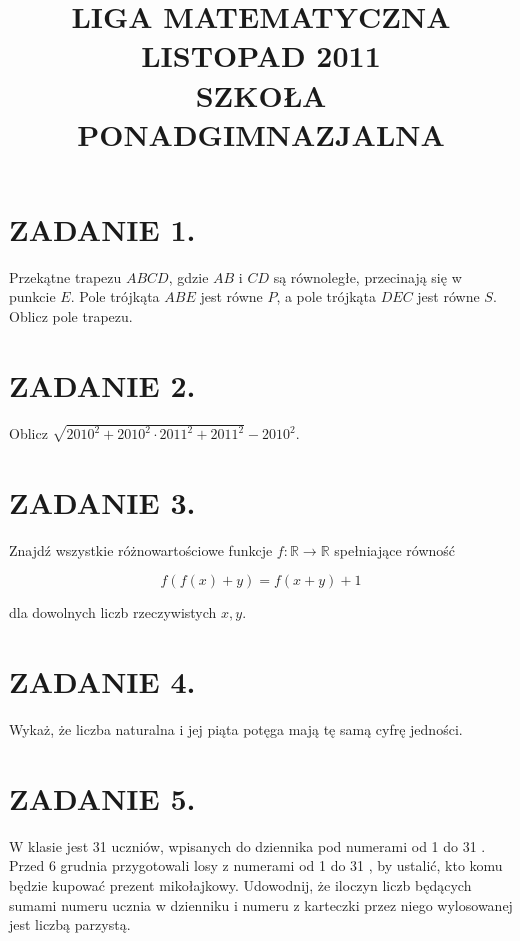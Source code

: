 \documentclass[10pt]{article}
\title{LIGA MATEMATYCZNA \\
 LISTOPAD 2011 \\
 SZKOŁA PONADGIMNAZJALNA }
\author{}
\date{}
\begin{document}
\maketitle
\section*{ZADANIE 1.}
Przekątne trapezu \(A B C D\), gdzie \(A B\) i \(C D\) są równoległe, przecinają się w punkcie \(E\). Pole trójkąta \(A B E\) jest równe \(P\), a pole trójkąta \(D E C\) jest równe \(S\). Oblicz pole trapezu.

\section*{ZADANIE 2.}
Oblicz \(\sqrt{2010^{2}+2010^{2} \cdot 2011^{2}+2011^{2}}-2010^{2}\).

\section*{ZADANIE 3.}
Znajdź wszystkie różnowartościowe funkcje \(f: \mathbb{R} \rightarrow \mathbb{R}\) spełniające równość

\[
f(f(x)+y)=f(x+y)+1
\]

dla dowolnych liczb rzeczywistych \(x, y\).

\section*{ZADANIE 4.}
Wykaż, że liczba naturalna i jej piąta potęga mają tę samą cyfrę jedności.

\section*{ZADANIE 5.}
W klasie jest 31 uczniów, wpisanych do dziennika pod numerami od 1 do 31 . Przed 6 grudnia przygotowali losy z numerami od 1 do 31 , by ustalić, kto komu będzie kupować prezent mikołajkowy. Udowodnij, że iloczyn liczb będących sumami numeru ucznia w dzienniku i numeru z karteczki przez niego wylosowanej jest liczbą parzystą.
\end{document}
